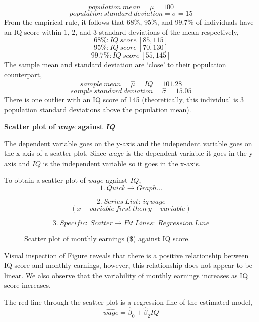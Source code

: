 \documentclass[12pt]{report}
\begin{document}
$$population\ mean = \mu = 100$$
$$population\ standard\ deviation = \sigma = 15$$
\noindent From the empirical rule, it follows that 68\%, 95\%, and 99.7\% of individuals have an IQ score within 1, 2, and 3 standard deviations of the mean respectively,
$$68\%: IQ\ score\ [85,115]$$
$$95\%: IQ\ score\ [70,130]$$
$$99.7\%: IQ\ score\ [55,145]$$
\noindent The sample mean and standard deviation are ‘close’ to their population counterpart,
$$sample\ mean = \hat{\mu} = \overline{IQ} = 101.28$$
$$sample\ standard\ deviation = \hat{\sigma} = 15.05$$
\noindent There is one outlier with an IQ score of 145 (theoretically, this individual is 3 population standard deviations above the population mean).
\begin{center}
	\noindent \textbf{Scatter plot of \textit{wage} against \textit{IQ}}
\end{center}
\noindent The dependent variable goes on the y-axis and the independent variable goes on the x-axis of a scatter plot. Since $wage$ is the dependent variable it goes in the y-axis and $IQ$ is the independent variable so it goes in the x-axis.

\noindent To obtain a scatter plot of $wage$ against $IQ$,
$$1.\ Quick \to Graph \dots$$
\begin{figure}[H]
	\centering
\end{figure}
\vspace{-\baselineskip}
$$2.\ Series\ List:\ iq\ wage$$
$$(x-variable\ first\ then\ y-variable)$$
\begin{figure}[H]
	\centering
\end{figure}
\vspace{-\baselineskip}
$$3.\ Specific:\ Scatter \to Fit\ Lines:\ Regression\ Line$$
\begin{figure}[H]
	\centering
\end{figure}
\vspace{-\baselineskip}
\begin{figure}[H]
	\caption{Scatter plot of monthly earnings (\$) against IQ score.}
\end{figure}
\vspace{-\baselineskip}
\noindent Visual inspection of Figure reveals that there is a positive relationship between IQ score and monthly earnings, however, this relationship does not appear to be linear. We also observe that the variability of monthly earnings increases as IQ score increases. \par
\noindent The red line through the scatter plot is a regression line of the estimated model,
$$\widehat{wage} = \hat{\beta}_0 + \hat{\beta}_2IQ$$
\end{document}
